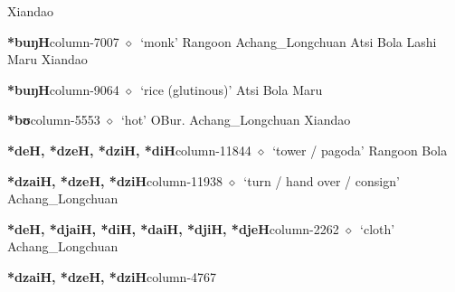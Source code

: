          Xiandao 
  \item {\footnotesize \textbf{*buŋH}}{\tiny column-7007}
         $\diamond$~`monk'
         Rangoon 
\hspace{1ex}
         Achang\_Longchuan 
\hspace{1ex}
         Atsi 
\hspace{1ex}
         Bola 
\hspace{1ex}
         Lashi 
\hspace{1ex}
         Maru 
\hspace{1ex}
         Xiandao 
  \item {\footnotesize \textbf{*buŋH}}{\tiny column-9064}
         $\diamond$~`rice (glutinous)'
         Atsi 
\hspace{1ex}
         Bola 
\hspace{1ex}
         Maru 
  \item {\footnotesize \textbf{*bʊ}}{\tiny column-5553}
         $\diamond$~`hot'
         OBur. 
\hspace{1ex}
         Achang\_Longchuan 
\hspace{1ex}
         Xiandao 
  \item {\footnotesize \textbf{*deH, *dzeH, *dziH, *diH}}{\tiny column-11844}
         $\diamond$~`tower / pagoda'
         Rangoon 
\hspace{1ex}
         Bola 
  \item {\footnotesize \textbf{*dzaiH, *dzeH, *dziH}}{\tiny column-11938}
         $\diamond$~`turn / hand over / consign'
         Achang\_Longchuan 
  \item {\footnotesize \textbf{*deH, *djaiH, *diH, *daiH, *djiH, *djeH}}{\tiny column-2262}
         $\diamond$~`cloth'
         Achang\_Longchuan 
  \item {\footnotesize \textbf{*dzaiH, *dzeH, *dziH}}{\tiny column-4767}

